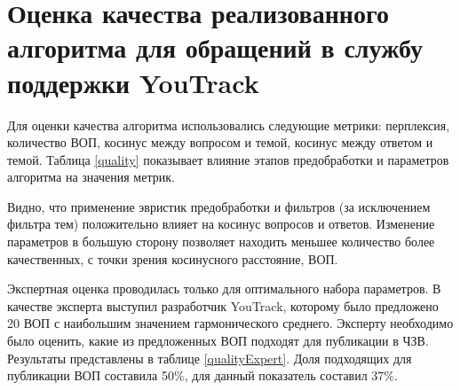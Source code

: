 \chapter{Оценка качества реализованного алгоритма для обращений в службу поддержки YouTrack}
\label{chap:quality}

Для оценки качества алгоритма использовались следующие метрики: перплексия, количество ВОП, косинус между вопросом и темой, косинус между ответом и темой. Таблица \ref{quality} показывает влияние этапов предобработки и параметров алгоритма на значения метрик.

Видно, что применение эвристик предобработки и фильтров (за исключением фильтра тем) положительно влияет на косинус вопросов и ответов. Изменение параметров в большую сторону позволяет находить меньшее количество более качественных, с точки зрения косинусного расстояние, ВОП.

Экспертная оценка проводилась только для оптимального набора параметров. В качестве эксперта выступил разработчик YouTrack, которому было предложено 20 ВОП с наибольшим значением гармонического среднего. Эксперту необходимо было оценить, какие из предложенных ВОП подходят для публикации в ЧЗВ. Результаты представлены в таблице \ref{qualityExpert}. Доля подходящих для публикации ВОП составила 50\%, для \cite{original} данный показатель составил 37\%. 

